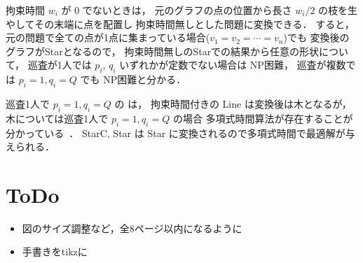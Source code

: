 拘束時間 $w_i$ が $0$ でないときは，
元のグラフの点の位置から長さ $w_i / 2$ の枝を生やしてその末端に点を配置し
拘束時間無しとした問題に変換できる．
すると，元の問題で全ての点が1点に集まっている場合($v_1 = v_2 = \cdots = v_n$)でも
変換後のグラフがStarとなるので，
拘束時間無しのStarでの結果から任意の形状について，
巡査が1人では $p_i$, $q_i$ いずれかが定数でない場合は NP困難，
巡査が複数では $p_i = 1, q_i = Q$ でも NP困難と分かる．

巡査1人で $p_i = 1, q_i = Q$ の \maxprofit は，
拘束時間付きの Line は変換後は木となるが，
木については巡査1人で $p_i = 1, q_i = Q$ の場合
多項式時間算法が存在することが分かっている~\cite{coene2013balancing}．
StarC, Star は Star に変換されるので多項式時間で最適解が与えられる．





\section{ToDo}
\begin{itemize}
	\item 図のサイズ調整など，全8ページ以内になるように
	\item 手書きをtikzに
\end{itemize}



